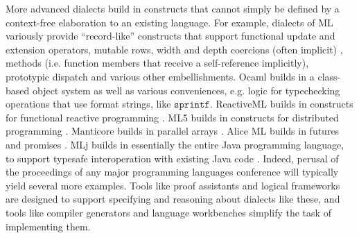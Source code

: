 More advanced dialects build in constructs that cannot simply be defined by a context-free elaboration to an existing language. For example, dialects of ML variously provide ``record-like'' constructs that support functional update and extension operators, mutable rows, width and depth coercions (often implicit) \cite{Cardelli:1984:SMI:1096.1098}, methods (i.e. function members that receive a self-reference implicitly), prototypic dispatch and various other embellishments. Ocaml builds in a class-based object system as well as various conveniences, e.g. logic for typechecking operations that use format strings, like $\mathtt{sprintf}$. ReactiveML builds in constructs for functional reactive programming \cite{mandel2005reactiveml}.  ML5 builds in constructs for distributed programming \cite{Murphy:2007:TDP:1793574.1793585}. Manticore builds in parallel arrays \cite{conf/popl/FluetRRSX07}. Alice ML builds in futures and promises . MLj builds in essentially the entire Java programming language, to support typesafe interoperation with existing Java code \cite{Benton:1999:IWW:317636.317791}. Indeed, perusal of the proceedings of any major programming languages conference will typically yield several more examples. Tools like proof assistants and logical frameworks are designed to support specifying and reasoning about dialects like these, and tools like compiler generators and language workbenches simplify the task of implementing them. 



